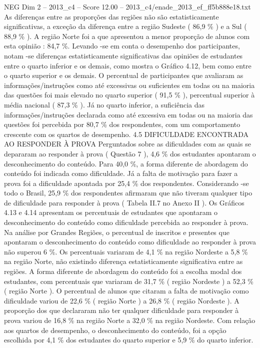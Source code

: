 \begin{textsample}{NEG Dim 2 – 2013\_c4 – Score 12.00 – 2013\_c4/enade\_2013\_ef\_ff5b888e18.txt}
As diferenças entre as proporções das regiões não são estatisticamente significativas, a exceção da diferença entre a região Sudeste ( 86,9 \% ) e a Sul ( 88,9 \% ).
A região Norte foi a que apresentou a menor proporção de alunos com esta opinião : 84,7 \%.
Levando -se em conta o desempenho dos participantes, notam -se diferenças estatisticamente significativas das opiniões de estudantes entre o quarto inferior e os demais, como mostra o Gráfico 4.12, bem como entre o quarto superior e os demais.
O percentual de participantes que avaliaram as informações/instruções como até excessivas ou suficientes em todas ou na maioria das questões foi mais elevado no quarto superior ( 91,5 \% ), percentual superior à média nacional ( 87,3 \% ).
Já no quarto inferior, a suficiência das informações/instruções declarada como até excessiva em todas ou na maioria das questões foi percebida por 80,7 \% dos respondentes, com um comportamento crescente com os quartos de desempenho. 4.5 DIFICULDADE ENCONTRADA AO RESPONDER À PROVA Perguntados sobre as dificuldades com as quais se depararam ao responder à prova ( Questão 7 ), 4,6 \% dos estudantes apontaram o desconhecimento do conteúdo.
Para 40,0 \%, a forma diferente de abordagem do conteúdo foi indicada como dificuldade.
Já a falta de motivação para fazer a prova foi a dificuldade apontada por 25,4 \% dos respondentes.
Considerando -se todo o Brasil, 25,9 \% dos respondentes afirmaram que não tiveram qualquer tipo de dificuldade para responder à prova ( Tabela II.7 no Anexo II ).
Os Gráficos 4.13 e 4.14 apresentam os percentuais de estudantes que apontaram o desconhecimento do conteúdo como dificuldade percebida ao responder à prova.
Na análise por Grandes Regiões, o percentual de inscritos e presentes que apontaram o desconhecimento do conteúdo como dificuldade ao responder à prova não superou 6 \%.
Os percentuais variaram de 4,1 \% na região Nordeste a 5,8 \% na região Norte, não existindo diferença estatisticamente significativa entre as regiões.
A forma diferente de abordagem do conteúdo foi a escolha modal dos estudantes, com percentuais que variaram de 31,7 \% ( região Nordeste ) a 52,3 \% ( região Norte ).
O percentual de alunos que citaram a falta de motivação como dificuldade variou de 22,6 \% ( região Norte ) a 26,8 \% ( região Nordeste ).
A proporção dos que declararam não ter qualquer dificuldade para responder à prova variou de 16,8 \% na região Norte a 32,0 \% na região Nordeste.
Com relação aos quartos de desempenho, o desconhecimento do conteúdo, foi a opção escolhida por 4,1 \% dos estudantes do quarto superior e 5,9 \% do quarto inferior.

\end{textsample}
